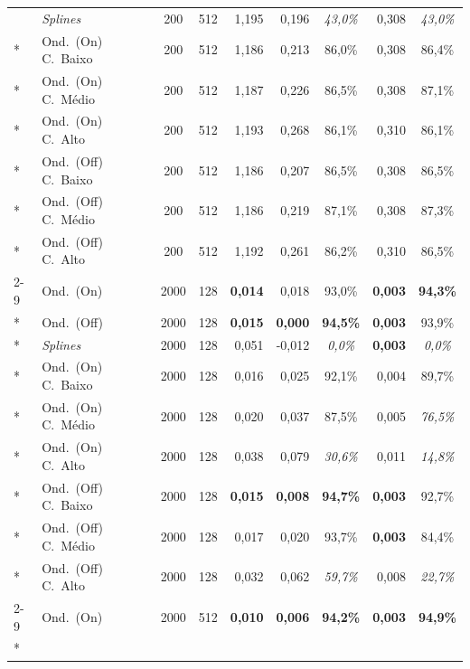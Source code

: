 {\begin{longtable}{@{}llccrrcrc@{}}
   & \emph{Splines} & 200 & 512 & 1{,}195 & 0{,}196 & \textit{43{,0\%}} & 0{,}308 & \textit{43{,0\%}} \\*
   & Ond.\ (On) C.\ Baixo & 200 & 512 & 1{,}186 & 0{,}213 & 86{,}0\% & 0{,}308 & 86{,}4\% \\*
   & Ond.\ (On) C.\ Médio & 200 & 512 & 1{,}187 & 0{,}226 & 86{,}5\% & 0{,}308 & 87{,}1\% \\*
   & Ond.\ (On) C.\ Alto & 200 & 512 & 1{,}193 & 0{,}268 & 86{,}1\% & 0{,}310 & 86{,}1\% \\*
   & Ond.\ (Off) C.\ Baixo & 200 & 512 & 1{,}186 & 0{,}207 & 86{,}5\% & 0{,}308 & 86{,}5\% \\*
   & Ond.\ (Off) C.\ Médio & 200 & 512 & 1{,}186 & 0{,}219 & 87{,}1\% & 0{,}308 & 87{,}3\% \\*
   & Ond.\ (Off) C.\ Alto & 200 & 512 & 1{,}192 & 0{,}261 & 86{,}2\% & 0{,}310 & 86{,}5\% \\
  \cmidrule{2-9}
  \multirow{9}{*}{\rotatebox[origin=c]{90}{Sigmoide}} & Ond.\ (On) & 2000 & 128 & \textbf{0{,014}} & 0{,}018 & 93{,}0\% & \textbf{0{,}003} & \textbf{94{,3\%}} \\*
   & Ond.\ (Off) & 2000 & 128 & \textbf{0{,015}} & \textbf{0{,000}} & \textbf{94{,5\%}} & \textbf{0{,003}} & 93{,}9\% \\*
   & \emph{Splines} & 2000 & 128 & 0{,}051 & -0{,}012 & \textit{0{,0\%}} & \textbf{0{,003}} & \textit{0{,0\%}} \\*
   & Ond.\ (On) C.\ Baixo & 2000 & 128 & 0{,016} & 0{,}025 & 92{,}1\% & 0{,}004 & 89{,}7\% \\*
   & Ond.\ (On) C.\ Médio & 2000 & 128 & 0{,}020 & 0{,}037 & 87{,}5\% & 0{,}005 & \textit{76{,5\%}} \\*
   & Ond.\ (On) C.\ Alto & 2000 & 128 & 0{,}038 & 0{,}079 & \textit{30{,6\%}} & 0{,}011 & \textit{14{,8\%}} \\*
   & Ond.\ (Off) C.\ Baixo & 2000 & 128 & \textbf{0{,015}} & \textbf{0{,008}} & \textbf{94{,7\%}} & \textbf{0{,003}} & 92{,}7\% \\*
   & Ond.\ (Off) C.\ Médio & 2000 & 128 & 0{,}017 & 0{,}020 & 93{,}7\% & \textbf{0{,}003} & 84{,}4\% \\*
   & Ond.\ (Off) C.\ Alto & 2000 & 128 & 0{,}032 & 0{,}062 & \textit{59{,7\%}} & 0{,}008 & \textit{22{,7\%}} \\
  \cmidrule{2-9}
  \multirow{9}{*}{\rotatebox[origin=c]{90}{Sigmoide}} & Ond.\ (On) & 2000 & 512 & \textbf{0{,010}} & \textbf{0{,006}} & \textbf{94{,2\%}} & \textbf{0{,003}} & \textbf{94{,9\%}} \\*

\end{longtable}}
